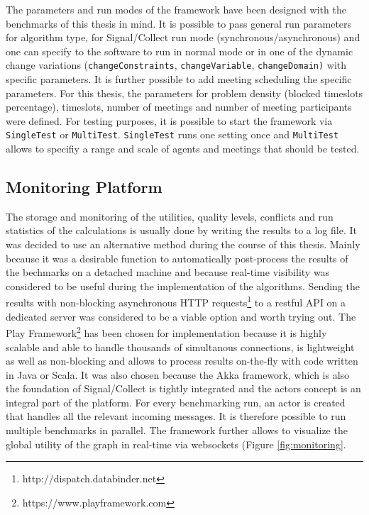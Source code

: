 \newline \newline
The parameters and run modes of the framework have been designed with the benchmarks of this thesis in mind.  It is possible to pass general run parameters for algorithm type, for Signal/Collect run mode (synchronous/asynchronous) and one can specify to the software to run in normal mode or in one of the dynamic change variations (\texttt{changeConstraints}, \texttt{changeVariable}, \texttt{changeDomain)} with specific parameters.  It is further possible to add meeting scheduling the specific parameters. For this thesis, the parameters for problem density (blocked timeslots percentage), timeslots, number of meetings and number of meeting participants were defined. For testing purposes, it is possible to start the framework via \texttt{SingleTest} or \texttt{MultiTest}. \texttt{SingleTest} runs one setting once and \texttt{MultiTest} allows to specifiy a range and scale of agents and meetings that should be tested.

\subsection{Monitoring Platform}
The  storage and monitoring of the utilities, quality levels, conflicts and run statistics of the calculations is usually done by writing the results to a log file. It was decided to use an alternative method during the course of this thesis. Mainly because it was a desirable function  to automatically post-process the results of the bechmarks on a detached machine and because real-time visibility was considered to be useful during the implementation of the algorithms. Sending the results with non-blocking asynchronous HTTP requests\footnote{http://dispatch.databinder.net} to a restful API on a dedicated server was considered to be a viable option and worth trying out. The Play Framework\footnote{https://www.playframework.com} has been chosen for implementation because it is highly scalable and able to handle thousands of simultanous connections, is lightweight as well as non-blocking and allows to process results on-the-fly with code written in Java or Scala. It was also chosen because the Akka framework, which is also the foundation of Signal/Collect is tightly integrated and the actors concept is an integral part of the platform. For every benchmarking run, an actor is created that handles all the relevant incoming messages. It is therefore possible to run multiple benchmarks in parallel. The framework further allows to visualize the global utility of the graph in real-time via websockets (Figure \ref{fig:monitoring}.

